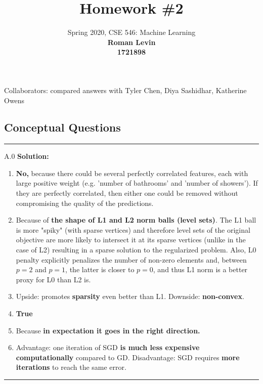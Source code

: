 \documentclass{article}
\date{{}}
\newcommand{\1}{\mathbf{1}}
\begin{document}
\title{Homework \#2}
\author{\normalsize{Spring 2020, CSE 546: Machine Learning}\\
\normalsize{\bf Roman Levin} \\
\normalsize{\bf 1721898} \\
}
\maketitle
Collaborators: compared answers with Tyler Chen, Diya Sashidhar, Katherine Owens

\subsection*{Conceptual Questions}
\noindent\rule{\textwidth}{1pt}

A.0 {\bf Solution:}\\
\begin{enumerate}
    \item {\bf No,} because there could be several perfectly correlated features, each with large positive weight (e.g. 'number of bathrooms' and 'number of showers'). If they are perfectly correlated, then either one could be removed without compromising the quality of the predictions.
    \item Because of {\bf the shape of L1 and L2 norm balls (level sets)}. The L1 ball is more "spiky" (with sparse vertices) and therefore level sets of the original objective are more likely to intersect it at its sparse vertices (unlike in the case of L2) resulting in a sparse solution to the regularized problem. Also, L0 penalty explicitly penalizes the number of non-zero elements and, between $p = 2$ and $p = 1$, the latter is closer to $p = 0$, and thus L1 norm is a better proxy for L0 than L2 is.
    \item Upside: promotes {\bf sparsity} even better than L1. Downside: {\bf non-convex}.
    \item {\bf True}
    \item Because {\bf in expectation it goes in the right direction.}
    \item Advantage: one iteration of SGD {\bf is much less expensive computationally} compared to GD. Disadvantage: SGD requires {\bf more iterations} to reach the same error.
\end{enumerate}

\noindent\rule{\textwidth}{1pt}
\end{document}
